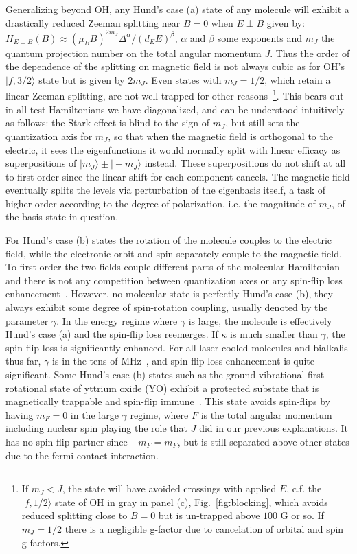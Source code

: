 \documentclass[%
 reprint,
groupedaddress,
 amsmath,amssymb,
 aps,
prl,
]{revtex4-1}
\newcommand{\epb}{{$E\!\perp\!B$}}
\newcommand{\epbm}{{E\!\perp\!B}}
\begin{document}
Generalizing beyond OH, any Hund's case (a) state of any molecule will exhibit a drastically reduced Zeeman splitting near $B=0$ when \epb{} given by: $H_\epbm(B)\approx (\mu_BB)^{2m_J}\Delta^\alpha/(d_EE)^\beta$, $\alpha$ and $\beta$ some exponents and $m_J$ the quantum projection number on the total angular momentum $J$. Thus the order of the dependence of the splitting on magnetic field is not always cubic as for OH's $|f,3/2\rangle$ state but is given by $2m_J$. Even states with $m_J=1/2$, which retain a linear Zeeman splitting, are not well trapped for other reasons~\footnote{If $m_J<J$, the state will have avoided crossings with applied $E$, c.f. the $|f,1/2\rangle$ state of OH in gray in panel (c), Fig.~\ref{fig:blocking}, which avoids reduced splitting close to $B=0$ but is un-trapped above $100\text{ G}$ or so. If $m_J=1/2$ there is a negligible g-factor due to cancelation of orbital and spin g-factors.}. This bears out in all test Hamiltonians we have diagonalized, and can be understood intuitively as follows: the Stark effect is blind to the sign of $m_J$, but still sets the quantization axis for $m_J$, so that when the magnetic field is orthogonal to the electric, it sees the eigenfunctions it would normally split with linear efficacy as superpositions of $|m_J\rangle\pm |-m_J\rangle$ instead. These superpositions do not shift at all to first order since the linear shift for each component cancels. The magnetic field eventually splits the levels via perturbation of the eigenbasis itself, a task of higher order according to the degree of polarization, i.e. the magnitude of $m_J$, of the basis state in question.

For Hund's case (b) states the rotation of the molecule couples to the electric field, while the electronic orbit and spin separately couple to the magnetic field. To first order the two fields couple different parts of the molecular Hamiltonian and there is not any competition between quantization axes or any spin-flip loss enhancement~\cite{Bohn2013}. However, no molecular state is perfectly Hund's case (b), they always exhibit some degree of spin-rotation coupling, usually denoted by the parameter $\gamma$. In the energy regime where $\gamma$ is large, the molecule is effectively Hund's case (a) and the spin-flip loss reemerges. If $\kappa$ is much smaller than $\gamma$, the spin-flip loss is significantly enhanced. For all laser-cooled molecules and bialkalis thus far, $\gamma$ is in the tens of MHz~\cite{Quemener2016}, and spin-flip loss enhancement is quite significant. Some Hund's case (b) states such as the ground vibrational first rotational state of yttrium oxide (YO) exhibit a protected substate that is magnetically trappable and spin-flip immune~\cite{Wu2017}. This state avoids spin-flips by having $m_F=0$ in the large $\gamma$ regime, where $F$ is the total angular momentum including nuclear spin playing the role that $J$ did in our previous explanations. It has no spin-flip partner since $-m_F=m_F$, but is still separated above other states due to the fermi contact interaction.
\end{document}
